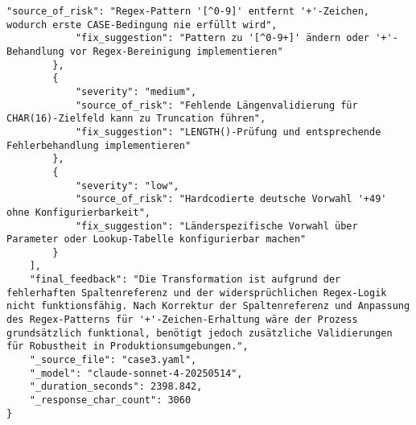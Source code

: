 \begin{lstlisting}[caption={Ausgabe: Claude Sonnet 4 Anwendungsfall 3 Robustheitsdurchlauf},label={claude_case3_prompt3}]
            "source_of_risk": "Regex-Pattern '[^0-9]' entfernt '+'-Zeichen, wodurch erste CASE-Bedingung nie erfüllt wird",
            "fix_suggestion": "Pattern zu '[^0-9+]' ändern oder '+'-Behandlung vor Regex-Bereinigung implementieren"
        },
        {
            "severity": "medium",
            "source_of_risk": "Fehlende Längenvalidierung für CHAR(16)-Zielfeld kann zu Truncation führen",
            "fix_suggestion": "LENGTH()-Prüfung und entsprechende Fehlerbehandlung implementieren"
        },
        {
            "severity": "low",
            "source_of_risk": "Hardcodierte deutsche Vorwahl '+49' ohne Konfigurierbarkeit",
            "fix_suggestion": "Länderspezifische Vorwahl über Parameter oder Lookup-Tabelle konfigurierbar machen"
        }
    ],
    "final_feedback": "Die Transformation ist aufgrund der fehlerhaften Spaltenreferenz und der widersprüchlichen Regex-Logik nicht funktionsfähig. Nach Korrektur der Spaltenreferenz und Anpassung des Regex-Patterns für '+'-Zeichen-Erhaltung wäre der Prozess grundsätzlich funktional, benötigt jedoch zusätzliche Validierungen für Robustheit in Produktionsumgebungen.",
    "_source_file": "case3.yaml",
    "_model": "claude-sonnet-4-20250514",
    "_duration_seconds": 2398.842,
    "_response_char_count": 3060
}
\end{lstlisting}

